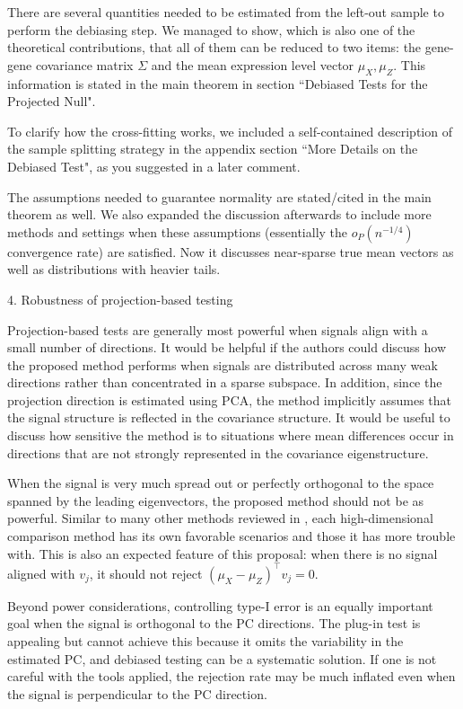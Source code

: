 \documentclass{article}
\theoremstyle{definition}
\begin{document}
There are several quantities needed to be estimated from the left-out sample to perform the debiasing step. We managed to show, which is also one of the theoretical contributions, that all of them can be reduced to two items: the gene-gene covariance matrix $\Sigma$ and the mean expression level vector $\mu_X, \mu_Z$. This information is stated in the main theorem in section ``Debiased Tests for the Projected Null".

To clarify how the cross-fitting works, we included a self-contained description of the sample splitting strategy in the appendix section ``More Details on the Debiased Test", as you suggested in a later comment.

The assumptions needed to guarantee normality are stated/cited in the main theorem as well. We also expanded the discussion afterwards to include more methods and settings when these assumptions (essentially the $o_P(n^{-1/4})$ convergence rate) are satisfied. Now it discusses near-sparse true mean vectors as well as distributions with heavier tails.

\begin{shaded}
    4. Robustness of projection-based testing

Projection-based tests are generally most powerful when signals align with a small number of directions. It would be helpful if the authors could discuss how the proposed method performs when signals are distributed across many weak directions rather than concentrated in a sparse subspace. In addition, since the projection direction is estimated using PCA, the method implicitly assumes that the signal structure is reflected in the covariance structure. It would be useful to discuss how sensitive the method is to situations where mean differences occur in directions that are not strongly represented in the covariance eigenstructure.
\end{shaded}

When the signal is very much spread out or perfectly orthogonal to the space spanned by the leading eigenvectors, the proposed method should not be as powerful. Similar to many other methods reviewed in \cite{huang2022overview},  each high-dimensional comparison method has its own favorable scenarios and those it has more trouble with. This is also an expected feature of this proposal: when there is no signal aligned with $v_j$, it should not reject $(\mu_X - \mu_Z)^\top v_j = 0$. 

Beyond power considerations, controlling type-I error is an equally important goal when the signal is orthogonal to the PC directions. The plug-in test is appealing but cannot achieve this because it omits the variability in the estimated PC, and debiased testing can be a systematic solution. If one is not careful with the tools applied, the rejection rate may be much inflated even when the signal is perpendicular to the PC direction. 
\end{document}
